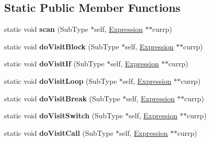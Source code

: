 \subsection*{Static Public Member Functions}
\begin{DoxyCompactItemize}
\item 
\mbox{\label{structwasm_1_1_walker_a3b6374f59fb1559e86905495cfd8af82}} 
static void {\bfseries scan} (Sub\+Type $\ast$self, \mbox{\hyperlink{classwasm_1_1_expression}{Expression}} $\ast$$\ast$currp)
\item 
\mbox{\label{structwasm_1_1_walker_ae941d315f80419441db1d6758bae664c}} 
static void {\bfseries do\+Visit\+Block} (Sub\+Type $\ast$self, \mbox{\hyperlink{classwasm_1_1_expression}{Expression}} $\ast$$\ast$currp)
\item 
\mbox{\label{structwasm_1_1_walker_ae84da181bf441329cd33153fd0d42a7a}} 
static void {\bfseries do\+Visit\+If} (Sub\+Type $\ast$self, \mbox{\hyperlink{classwasm_1_1_expression}{Expression}} $\ast$$\ast$currp)
\item 
\mbox{\label{structwasm_1_1_walker_a266732306f1dcb90f72cf7fbadfdaccc}} 
static void {\bfseries do\+Visit\+Loop} (Sub\+Type $\ast$self, \mbox{\hyperlink{classwasm_1_1_expression}{Expression}} $\ast$$\ast$currp)
\item 
\mbox{\label{structwasm_1_1_walker_a0c4928b13bbff0b2184b06ed6c735f24}} 
static void {\bfseries do\+Visit\+Break} (Sub\+Type $\ast$self, \mbox{\hyperlink{classwasm_1_1_expression}{Expression}} $\ast$$\ast$currp)
\item 
\mbox{\label{structwasm_1_1_walker_aebc2fe9ee939698800416d1310057a02}} 
static void {\bfseries do\+Visit\+Switch} (Sub\+Type $\ast$self, \mbox{\hyperlink{classwasm_1_1_expression}{Expression}} $\ast$$\ast$currp)
\item 
\mbox{\label{structwasm_1_1_walker_a5223b2a3e0e561f80a10972970a2b7df}} 
static void {\bfseries do\+Visit\+Call} (Sub\+Type $\ast$self, \mbox{\hyperlink{classwasm_1_1_expression}{Expression}} $\ast$$\ast$currp)
\item 
\mbox{\label{structwasm_1_1_walker_a77fe5974a58333a7a468e06ff392303f}} 
$$
\end{DoxyCompactItemize}
